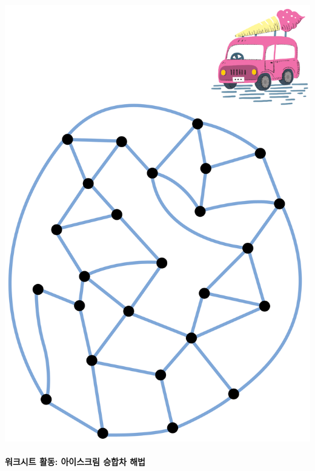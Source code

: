 \documentclass[]{article}
\begin{document}
\includegraphics{csunplugged/04-part/img/ch15-dominating-sets/14-dominating-sets-03-icecream-vans.png}

\mbox{}\paragraph{워크시트 활동: 아이스크림 승합차 해법}\label{section-206}
\end{document}
